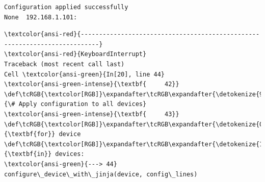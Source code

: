 \documentclass[11pt]{article}
\begin{document}
    \begin{Verbatim}[commandchars=\\\{\}]
Configuration applied successfully
None  192.168.1.101:
    \end{Verbatim}

    \begin{Verbatim}[commandchars=\\\{\}, frame=single, framerule=2mm, rulecolor=\color{outerrorbackground}]
\textcolor{ansi-red}{---------------------------------------------------------------------------}
\textcolor{ansi-red}{KeyboardInterrupt}                         Traceback (most recent call last)
Cell \textcolor{ansi-green}{In[20], line 44}
\textcolor{ansi-green-intense}{\textbf{     42}} \def\tcRGB{\textcolor[RGB]}\expandafter\tcRGB\expandafter{\detokenize{95,135,135}}{\# Apply configuration to all devices}
\textcolor{ansi-green-intense}{\textbf{     43}} \def\tcRGB{\textcolor[RGB]}\expandafter\tcRGB\expandafter{\detokenize{0,135,0}}{\textbf{for}} device \def\tcRGB{\textcolor[RGB]}\expandafter\tcRGB\expandafter{\detokenize{175,0,255}}{\textbf{in}} devices:
\textcolor{ansi-green}{---> 44}     configure\_device\_with\_jinja(device, config\_lines)


\end{Verbatim}
\end{document}
